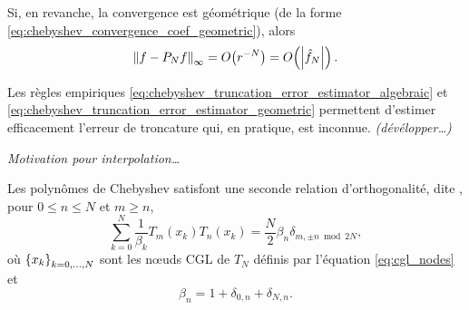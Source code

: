 Si, en revanche, la convergence est géométrique (\ie de la forme \eqref{eq:chebyshev_convergence_coef_geometric}), alors 
\begin{equation}
	\norminf{f - \truncseries{f}{N}} 
	= \bigO{r^{-N}}
	= \bigO{\left| \hat{f}_N \right|}.
	\label{eq:chebyshev_truncation_error_estimator_geometric}
\end{equation}

Les règles empiriques \eqref{eq:chebyshev_truncation_error_estimator_algebraic} et \eqref{eq:chebyshev_truncation_error_estimator_geometric} permettent d'estimer efficacement l'erreur de troncature qui, en pratique, est inconnue. \textit{(dévélopper\ldots)}

\par\bigskip
\textit{Motivation pour interpolation\ldots}

Les polynômes de Chebyshev satisfont une seconde relation d'orthogonalité, dite , pour $0 \leq n \leq N$ et $m \geq n$,
\begin{equation}
	\sum_{k=0}^{N} \frac{1}{\beta_k} T_m(x_k) T_n(x_k) = 
	\frac{N}{2} \beta_n \delta_{m,\pm n \bmod{2N}},
	\label{eq:chebyshev_discrete_orthogonality}
\end{equation}
où $\left\{{x}_{k}\right\}_{{k}={0},\ldots,{N}}$ sont les n\oe uds CGL de $T_N$ définis par l'équation \eqref{eq:cgl_nodes} et
\begin{equation}
	\beta_n = 
	1 + \delta_{0,n} + \delta_{N,n}.
\end{equation}

\par


